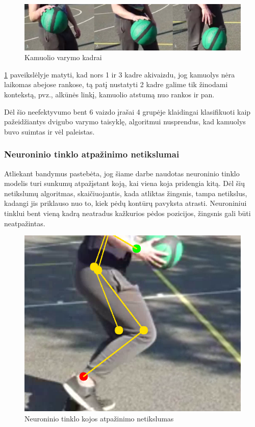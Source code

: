 \documentclass{VUMIFPSbakalaurinis}
\begin{document}
{\begin{figure}[H]
	\centering
	\includegraphics[scale=0.3]{img/double_dribble_fault.png}
	\caption{ Kamuolio varymo kadrai }
	\label{img:double_dribble_fault}
\end{figure}

\ref{img:double_dribble_fault} paveikslėlyje matyti, kad nors 1 ir 3 kadre akivaizdu, jog kamuolys nėra laikomas abejose rankose, tą patį nustatyti 2 kadre galime tik žinodami kontekstą, pvz., alkūnės linkį, kamuolio atstumą nuo rankos ir pan.  

Dėl šio neefektyvumo bent 6 vaizdo įrašai 4 grupėje klaidingai klasifikuoti kaip pažeidžiantys dvigubo varymo taisyklę, algoritmui nusprendus, kad kamuolys buvo suimtas ir vėl paleistas. 

\subsubsection{Neuroninio tinklo atpažinimo netikslumai}

Atliekant bandymus pastebėta, jog šiame darbe naudotas neuroninio tinklo modelis turi sunkumų atpažįstant koją, kai viena koja pridengia kitą. Dėl šių netikslumų algoritmas, skaičiuojantis, kada atliktas žingsnis, tampa netikslus, kadangi jis priklauso nuo to, kiek pėdų kontūrų pavyksta atrasti. Neuroniniui tinklui bent vieną kadrą neatradus kažkurios pėdos pozicijos, žingsnis gali būti neatpažintas. 

\begin{figure}[H]
	\centering
	\includegraphics[scale=0.6]{img/neural_network_fault.png}
	\caption{ Neuroninio tinklo kojos atpažinimo netikslumas }
	\label{img:neural_network_fault}
\end{figure}

}
\end{document}
